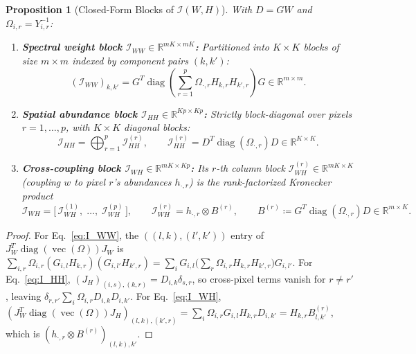 \documentclass[11pt,a4paper]{article}
\theoremstyle{plain}
\newtheorem{proposition}[theorem]{Proposition}
\theoremstyle{definition}
\theoremstyle{remark}
\newcommand{\R}{\mathbb{R}}
\newcommand{\cI}{\mathcal{I}}
\newcommand{\vecop}{\operatorname{vec}}
\newcommand{\diag}{\operatorname{diag}}
\newcommand{\kron}{\otimes}
\begin{document}
\begin{proposition}[Closed-Form Blocks of $\cI(W,H)$]
\label{prop:fim_blocks}
With $D = GW$ and $\Omega_{i,r} = Y_{i,r}^{-1}$:
\begin{enumerate}[leftmargin=1.5em]
    \item \textbf{Spectral weight block $\cI_{WW} \in \R^{mK \times mK}$:} Partitioned into $K \times K$ blocks of size $m \times m$ indexed by component pairs $(k, k')$:
    \begin{equation}
    \label{eq:I_WW}
    (\cI_{WW})_{k,k'} = G^T \diag\!\left( \sum_{r=1}^p \Omega_{\cdot, r} H_{k,r} H_{k',r} \right) G \in \R^{m \times m}.
    \end{equation}
    \item \textbf{Spatial abundance block $\cI_{HH} \in \R^{Kp \times Kp}$:} Strictly block-diagonal over pixels $r = 1,\dots,p$, with $K \times K$ diagonal blocks:
    \begin{equation}
    \label{eq:I_HH}
    \cI_{HH} = \bigoplus_{r=1}^{p} \cI_{HH}^{(r)}, \qquad \cI_{HH}^{(r)} = D^T \diag(\Omega_{\cdot, r}) D \in \R^{K \times K}.
    \end{equation}
    \item \textbf{Cross-coupling block $\cI_{WH} \in \R^{mK \times Kp}$:} Its $r$-th column block $\cI_{WH}^{(r)} \in \R^{mK \times K}$ (coupling $w$ to pixel $r$'s abundances $h_{\cdot, r}$) is the rank-factorized Kronecker product
    \begin{equation}
    \label{eq:I_WH}
    \cI_{WH} = \big[\, \cI_{WH}^{(1)},\; \dots,\; \cI_{WH}^{(p)} \,\big], \qquad \cI_{WH}^{(r)} = h_{\cdot, r} \kron B^{(r)}, \qquad B^{(r)} \coloneqq G^T \diag(\Omega_{\cdot, r}) D \in \R^{m \times K}.
    \end{equation}
\end{enumerate}
\end{proposition}

\begin{proof}
For Eq.~\eqref{eq:I_WW}, the $((l,k),(l',k'))$ entry of $J_W^T \diag(\vecop(\Omega)) J_W$ is $\sum_{i,r} \Omega_{i,r} (G_{i,l} H_{k,r})(G_{i,l'} H_{k',r}) = \sum_i G_{i,l} \big(\sum_r \Omega_{i,r} H_{k,r} H_{k',r}\big) G_{i,l'}$. For Eq.~\eqref{eq:I_HH}, $(J_H)_{(i,s),(k,r)} = D_{i,k} \delta_{s,r}$, so cross-pixel terms vanish for $r \neq r'$, leaving $\delta_{r,r'} \sum_i \Omega_{i,r} D_{i,k} D_{i,k'}$. For Eq.~\eqref{eq:I_WH}, $(J_W^T \diag(\vecop(\Omega)) J_H)_{(l,k),(k',r)} = \sum_i \Omega_{i,r} G_{i,l} H_{k,r} D_{i,k'} = H_{k,r} B^{(r)}_{l,k'}$, which is $(h_{\cdot,r} \kron B^{(r)})_{(l,k), k'}$.
\end{proof}
\end{document}
